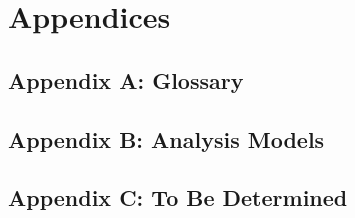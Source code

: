 \section{Appendices}
\label{sec:appendices}

\subsection{Appendix A: Glossary}
\label{sec:glossary}

\subsection{Appendix B: Analysis Models}
\label{sec:analysis}

\subsection{Appendix C: To Be Determined}
\label{sec:tbd}


